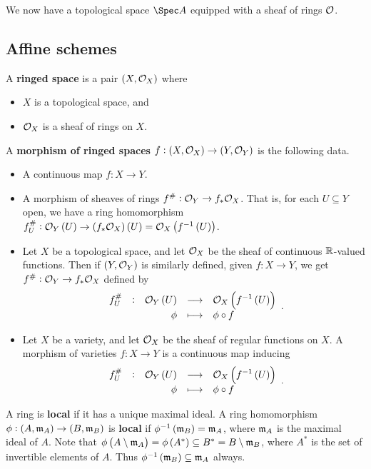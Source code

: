 We now have a topological space $ \Spec A $ equipped with a sheaf of rings $ \mathcal{O} $.

\pagebreak

\subsection{Affine schemes}

\begin{definition*}
A \textbf{ringed space} is a pair $ \br{X, \OOO_X} $ where
\begin{itemize}
\item $ X $ is a topological space, and
\item $ \mathcal{O}_X $ is a sheaf of rings on $ X $.
\end{itemize}
A \textbf{morphism of ringed spaces} $ f : \br{X, \OOO_X} \to \br{Y, \OOO_Y} $ is the following data.
\begin{itemize}
\item A continuous map $ f : X \to Y $.
\item A morphism of sheaves of rings $ f^\# : \mathcal{O}_Y \to f_*\mathcal{O}_X $. That is, for each $ U \subseteq Y $ open, we have a ring homomorphism $ f_U^\# : \OOO_Y\br{U} \to \br{f_*\OOO_X}\br{U} = \OOO_X\br{f^{-1}\br{U}} $.
\end{itemize}
\end{definition*}

\begin{example*}
\hfill
\begin{itemize}
\item Let $ X $ be a topological space, and let $ \mathcal{O}_X $ be the sheaf of continuous $ \mathbb{R} $-valued functions. Then if $ \br{Y, \OOO_Y} $ is similarly defined, given $ f : X \to Y $, we get $ f^\# : \mathcal{O}_Y \to f_*\mathcal{O}_X $ defined by
$$ \function[f_U^\#]{\OOO_Y\br{U}}{\OOO_X\br{f^{-1}\br{U}}}{\phi}{\phi \circ f}. $$
\item Let $ X $ be a variety, and let $ \mathcal{O}_X $ be the sheaf of regular functions on $ X $. A morphism of varieties $ f : X \to Y $ is a continuous map inducing
$$ \function[f_U^\#]{\OOO_Y\br{U}}{\OOO_X\br{f^{-1}\br{U}}}{\phi}{\phi \circ f}. $$
\end{itemize}
\end{example*}

A ring is \textbf{local} if it has a unique maximal ideal. A ring homomorphism $ \phi : \br{A, \mmm_A} \to \br{B, \mmm_B} $ is \textbf{local} if $ \phi^{-1}\br{\mmm_B} = \mmm_A $, where $ \mathfrak{m}_A $ is the maximal ideal of $ A $. Note that $ \phi\br{A \setminus \mmm_A} = \phi\br{A^*} \subseteq B^* = B \setminus \mmm_B $, where $ A^* $ is the set of invertible elements of $ A $. Thus $ \phi^{-1}\br{\mmm_B} \subseteq \mmm_A $ always.

